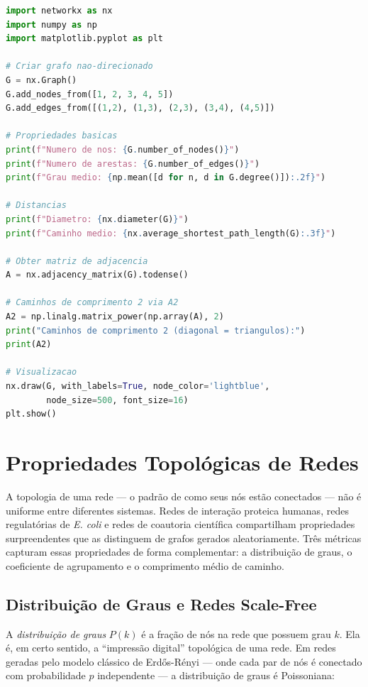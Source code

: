 \begin{lstlisting}[language=Python, caption=Criacao e analise basica de grafos com NetworkX]
import networkx as nx
import numpy as np
import matplotlib.pyplot as plt

# Criar grafo nao-direcionado
G = nx.Graph()
G.add_nodes_from([1, 2, 3, 4, 5])
G.add_edges_from([(1,2), (1,3), (2,3), (3,4), (4,5)])

# Propriedades basicas
print(f"Numero de nos: {G.number_of_nodes()}")
print(f"Numero de arestas: {G.number_of_edges()}")
print(f"Grau medio: {np.mean([d for n, d in G.degree()]):.2f}")

# Distancias
print(f"Diametro: {nx.diameter(G)}")
print(f"Caminho medio: {nx.average_shortest_path_length(G):.3f}")

# Obter matriz de adjacencia
A = nx.adjacency_matrix(G).todense()

# Caminhos de comprimento 2 via A2
A2 = np.linalg.matrix_power(np.array(A), 2)
print("Caminhos de comprimento 2 (diagonal = triangulos):")
print(A2)

# Visualizacao
nx.draw(G, with_labels=True, node_color='lightblue',
        node_size=500, font_size=16)
plt.show()
\end{lstlisting}

\section{Propriedades Topológicas de Redes}

A topologia de uma rede --- o padrão de como seus nós estão conectados --- não é uniforme
entre diferentes sistemas. Redes de interação proteica humanas, redes regulatórias de
\textit{E. coli} e redes de coautoria científica compartilham propriedades surpreendentes
que as distinguem de grafos gerados aleatoriamente. Três métricas capturam essas
propriedades de forma complementar: a distribuição de graus, o coeficiente de agrupamento
e o comprimento médio de caminho.

\subsection{Distribuição de Graus e Redes Scale-Free}

A \emph{distribuição de graus} $P(k)$ é a fração de nós na rede que possuem grau $k$.
Ela é, em certo sentido, a ``impressão digital'' topológica de uma rede. Em redes geradas
pelo modelo clássico de Erdős-Rényi --- onde cada par de nós é conectado com probabilidade
$p$ independente --- a distribuição de graus é Poissoniana:

